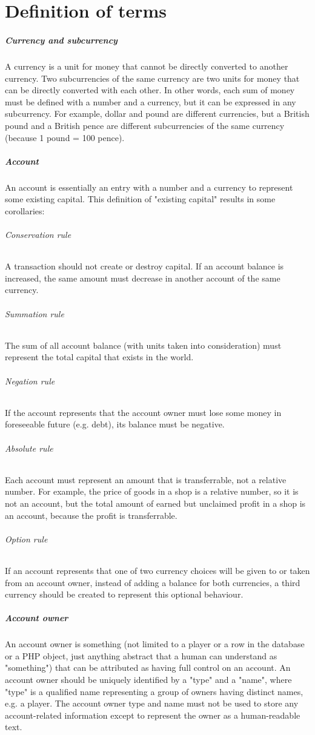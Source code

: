 \documentclass{report}
\begin{document}
		\chapter{Definition of terms}
			\paragraph{Currency and subcurrency}
				A currency is a unit for money that cannot be directly converted to another currency.
				Two subcurrencies of the same currency are two units for money that can be directly converted with each other.
				In other words, each sum of money must be defined with a number and a currency, but it can be expressed in any subcurrency.
				For example, dollar and pound are different currencies, but a British pound and a British pence are different subcurrencies of the same currency
				(because 1 pound = 100 pence).

			\paragraph{Account}
				An account is essentially an entry with a number and a currency to represent some existing capital.
				This definition of "existing capital" results in some corollaries:
				\subparagraph{Conservation rule} A transaction should not create or destroy capital.
					If an account balance is increased, the same amount must decrease in another account of the same currency.
				\subparagraph{Summation rule} The sum of all account balance (with units taken into consideration) must represent the total capital that exists in the world.
				\subparagraph{Negation rule} If the account represents that the account owner must lose some money in foreseeable future (e.g. debt), its balance must be negative.
				\subparagraph{Absolute rule} Each account must represent an amount that is transferrable, not a relative number.
					For example, the price of goods in a shop is a relative number, so it is not an account,
					but the total amount of earned but unclaimed profit in a shop is an account, because the profit is transferrable.
				\subparagraph{Option rule} If an account represents that one of two currency choices will be given to or taken from an account owner,
					instead of adding a balance for both currencies, a third currency should be created to represent this optional behaviour.

			\paragraph{Account owner}
				An account owner is something (not limited to a player or a row in the database or a PHP object,
				just anything abstract that a human can understand as "something") that can be attributed as having full control on an account.
				An account owner should be uniquely identified by a "type" and a "name",
				where "type" is a qualified name representing a group of owners having distinct names, e.g. a player.
				The account owner type and name must not be used to store any account-related information except to represent the owner as a human-readable text.
\end{document}
